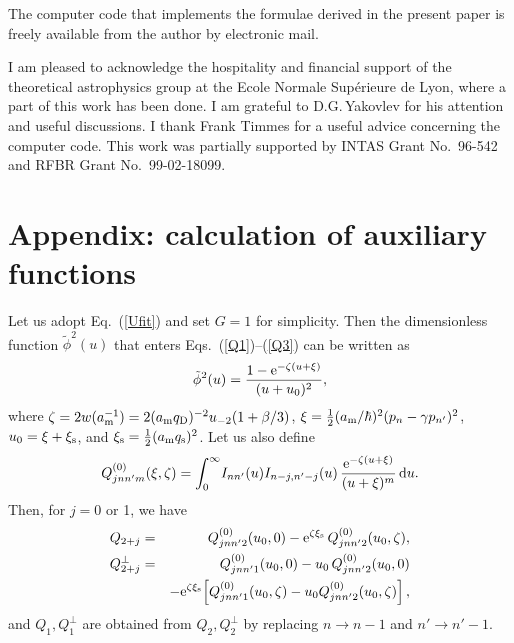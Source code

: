\documentclass{aa}
\newcommand{\beq}{\begin{equation}}
\newcommand{\eeq}{\end{equation}}
\newcommand{\req}[1]{Eq.~(\ref{#1})}
\newcommand{\am}{a_{\rm m}}
\begin{document}
{{The computer code that implements the formulae
derived in the present paper
is freely available from the author by electronic mail.

\begin{acknowledgements}
I am pleased to acknowledge the hospitality
and financial support of the theoretical astrophysics group
at the Ecole Normale Sup\'erieure de Lyon,
where a part of this work has been done.
I am grateful to D.G.\,Yakovlev for his attention and
useful discussions.
I thank Frank Timmes for a useful advice concerning the computer code.
This work was partially supported by INTAS Grant No.\ 96-542
and RFBR Grant No.\ 99-02-18099.
\end{acknowledgements}

\appendix
\addtocounter{section}{1}
\setcounter{equation}{0}
\section*{Appendix: calculation of auxiliary functions}
Let us adopt \req{Ufit} and set $G=1$
for simplicity. Then the dimensionless function $\tilde\phi^2(u)$
that enters Eqs.~(\ref{Q1})--(\ref{Q3})
can be written as
\beq
   \tilde\phi^2(u) = {1-\mathrm{e}^{-\zeta (u+\xi)}
            \over (u+{u_0})^2},
\label{tilde-phi}
\eeq
where $\zeta = 2w(\am^{-1}) = 2 (\am q_{\rm D})^{-2} u_{-2} (1+\beta/3)$,
$\xi = \frac12 (\am/\hbar)^2 (p_n-\gamma p_{n'})^2$,
${u_0}=\xi+\xi_{\rm s}$, and
$\xi_{\rm s} = \frac12 (\am q_{\rm s})^2$.
Let us also define
\beq
   Q^{(0)}_{jnn'm}(\xi,\zeta) =
      \int_0^\infty \! I_{nn'}(u)I_{n-j,n'-j}(u)\,
         {\mathrm{e}^{-\zeta(u+\xi)} \over (u+\xi)^m } \,{\rm d}u.
\label{Q0}
\eeq
Then, for $j=0$ or 1, we have
\begin{eqnarray}
   Q_{2+j} &=& Q^{(0)}_{jnn'2}({u_0},0)
               - \mathrm{e}^{\zeta\xi_{\rm s}}
                 \, Q^{(0)}_{jnn'2}({u_0},\zeta),
\\
   Q_{2+j}^\perp &=& Q^{(0)}_{jnn'1}({u_0},0)
            - {u_0}\, Q^{(0)}_{jnn'2}({u_0},0)
\nonumber\\&&
               - \mathrm{e}^{\zeta\xi_{\rm s}}
               \! \left[  Q^{(0)}_{jnn'1}({u_0},\zeta)
            - {u_0} Q^{(0)}_{jnn'2}({u_0},\zeta) \right],
\label{Qperp}
\end{eqnarray}
and $Q_1, Q_1^\perp$ are obtained from $Q_2, Q_2^\perp$
by replacing $n \to n-1$ and $n' \to n'-1$.

}}
\end{document}
